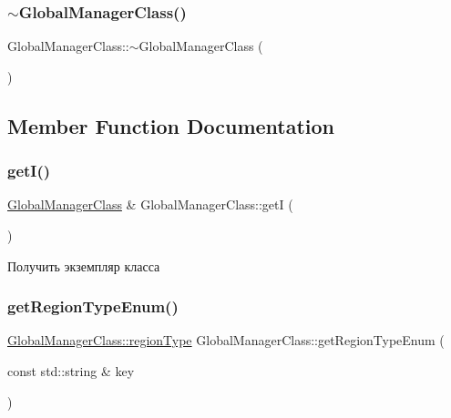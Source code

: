 \subsubsection{\texorpdfstring{$\sim$\+Global\+Manager\+Class()}{~GlobalManagerClass()}}
{\footnotesize\ttfamily Global\+Manager\+Class\+::$\sim$\+Global\+Manager\+Class (\begin{DoxyParamCaption}{ }\end{DoxyParamCaption})\hspace{0.3cm}{\ttfamily [private]}}



\subsection{Member Function Documentation}
\mbox{\label{class_global_manager_class_ac6cf763853c150bb15e0a5bda7f5f66c}} 
\subsubsection{\texorpdfstring{get\+I()}{getI()}}
{\footnotesize\ttfamily \hyperlink{class_global_manager_class}{Global\+Manager\+Class} \& Global\+Manager\+Class\+::getI (\begin{DoxyParamCaption}{ }\end{DoxyParamCaption})\hspace{0.3cm}{\ttfamily [static]}}



Получить экземпляр класса 

\mbox{\label{class_global_manager_class_a882a8b1b96ed1f1210dd8faef5d305c9}} 
\subsubsection{\texorpdfstring{get\+Region\+Type\+Enum()}{getRegionTypeEnum()}\hspace{0.1cm}{\footnotesize\ttfamily [1/2]}}
{\footnotesize\ttfamily \hyperlink{class_global_manager_class_a794b4a5298c61f8d25d9da44b7826857}{Global\+Manager\+Class\+::region\+Type} Global\+Manager\+Class\+::get\+Region\+Type\+Enum (\begin{DoxyParamCaption}\item[{const std\+::string \&}]{key }\end{DoxyParamCaption})}



